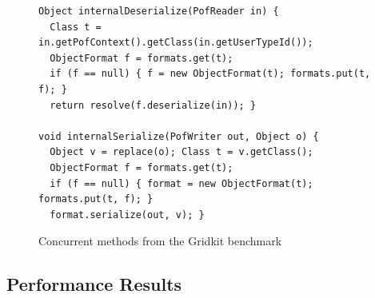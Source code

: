 \begin{figure}[tb]
%
\footnotesize
\begin{lstlisting}
Object internalDeserialize(PofReader in) {
  Class t = in.getPofContext().getClass(in.getUserTypeId());
  ObjectFormat f = formats.get(t);
  if (f == null) { f = new ObjectFormat(t); formats.put(t, f); }
  return resolve(f.deserialize(in)); }

void internalSerialize(PofWriter out, Object o) {
  Object v = replace(o); Class t = v.getClass();
  ObjectFormat f = formats.get(t);
  if (f == null) { format = new ObjectFormat(t); formats.put(t, f); }
  format.serialize(out, v); }
\end{lstlisting}
	\caption{\label{Fi:gridkitPair}Concurrent methods from the Gridkit benchmark}
\end{figure}

\subsection{Performance Results} 

